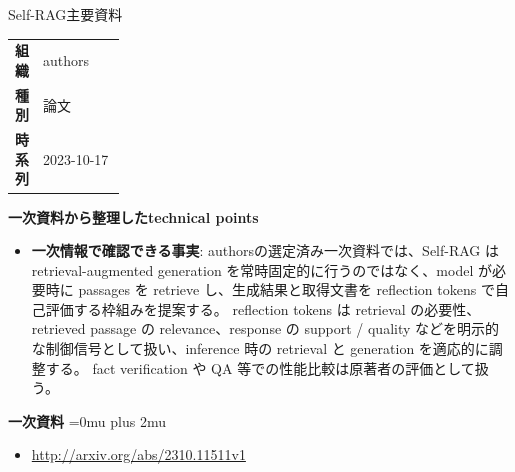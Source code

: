 \begin{technicalnote}{Self-RAG}{主要資料}
\begingroup
\begin{tabularx}{\linewidth}{@{}>{\bfseries}p{0.22\linewidth}X@{}}
組織 & authors \\
種別 & 論文 \\
時系列 & 2023-10-17 \\
\end{tabularx}
\smallskip
{\bfseries 一次資料から整理したtechnical points}
\begin{itemize}[leftmargin=1.5em,itemsep=0.35em]
\item \textbf{一次情報で確認できる事実}: authorsの選定済み一次資料では、Self-RAG は retrieval-augmented generation を常時固定的に行うのではなく、model が必要時に passages を retrieve し、生成結果と取得文書を reflection tokens で自己評価する枠組みを提案する。 reflection tokens は retrieval の必要性、retrieved passage の relevance、response の support / quality などを明示的な制御信号として扱い、inference 時の retrieval と generation を適応的に調整する。 fact verification や QA 等での性能比較は原著者の評価として扱う。
\end{itemize}
\begin{minipage}{\linewidth}
\begin{samepage}
{\bfseries 一次資料}
\begingroup\sloppy
\Urlmuskip=0mu plus 2mu\relax
\begin{itemize}[leftmargin=1.5em,itemsep=0.25em]
\item {\scriptsize\url{http://arxiv.org/abs/2310.11511v1}}
\end{itemize}
\endgroup
\end{samepage}
\end{minipage}
\endgroup
\end{technicalnote}
\medskip

